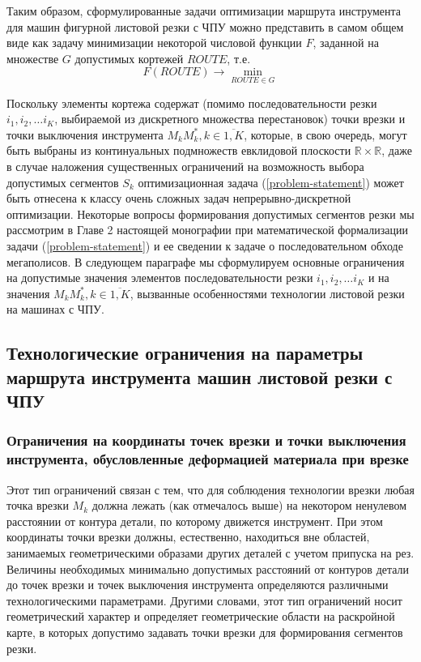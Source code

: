 \documentclass{article}
\begin{document}
Таким образом, сформулированные задачи оптимизации
маршрута инструмента для машин фигурной листовой резки с ЧПУ
можно представить в самом общем виде
как задачу минимизации некоторой числовой функции $F$,
заданной на множестве $G$ допустимых кортежей $ROUTE$, т.е.
\begin{equation}
  F(ROUTE) \to \min_{ROUTE \in G}
  \label{problem-statement}
\end{equation}

Поскольку элементы кортежа содержат
(помимо последовательности резки
$i_1, i_2, \dots i_K$,
выбираемой из дискретного множества перестановок)
точки врезки и точки выключения инструмента
$M_kM_k^*, k \in \overline{1,K}$,
которые, в свою очередь,
могут быть выбраны из континуальных подмножеств евклидовой плоскости
$\mathbb R \times \mathbb R$,
даже в случае наложения существенных ограничений
на возможность выбора допустимых сегментов
$S_k$
оптимизационная задача (\ref{problem-statement})
может быть отнесена к классу очень сложных задач
непрерывно-дискретной оптимизации.
Некоторые вопросы формирования допустимых сегментов резки мы рассмотрим в Главе 2
настоящей монографии при математической формализации задачи (\ref{problem-statement})
и ее сведении к задаче о последовательном обходе мегаполисов.
В следующем параграфе мы сформулируем основные ограничения
на допустимые значения элементов последовательности резки
$i_1, i_2, \dots i_K$
и на значения
$M_kM_k^*, k \in \overline{1,K}$,
вызванные особенностями технологии листовой резки на машинах с ЧПУ.

\subsection{Технологические ограничения на параметры маршрута инструмента машин листовой резки с ЧПУ}

\subsubsection{Ограничения на координаты точек врезки и точки выключения инструмента, обусловленные деформацией материала при врезке}

Этот тип ограничений связан с тем,
что для соблюдения технологии врезки любая точка врезки
$M_k$
должна лежать (как отмечалось выше)
на некотором ненулевом расстоянии от контура детали,
по которому движется инструмент.
При этом координаты точки врезки должны,
естественно, находиться вне областей,
занимаемых геометрическими образами других деталей с учетом припуска на рез.
Величины необходимых минимально допустимых расстояний
от контуров детали до точек врезки и точек выключения
инструмента определяются различными технологическими параметрами.
Другими словами, этот тип ограничений носит геометрический характер
и определяет геометрические области на раскройной карте,
в которых допустимо задавать точки врезки для формирования сегментов резки.
\end{document}
